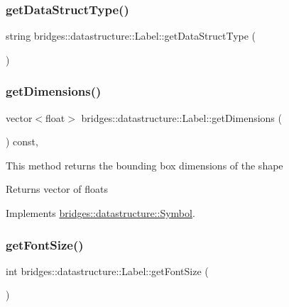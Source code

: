 \subsubsection{\texorpdfstring{get\+Data\+Struct\+Type()}{getDataStructType()}}
{\footnotesize\ttfamily string bridges\+::datastructure\+::\+Label\+::get\+Data\+Struct\+Type (\begin{DoxyParamCaption}{ }\end{DoxyParamCaption})\hspace{0.3cm}{\ttfamily [inline]}}

\mbox{\label{classbridges_1_1datastructure_1_1_label_a39f904db9e21e038aa4c7cb274f657a5}} 
\subsubsection{\texorpdfstring{get\+Dimensions()}{getDimensions()}}
{\footnotesize\ttfamily vector$<$float$>$ bridges\+::datastructure\+::\+Label\+::get\+Dimensions (\begin{DoxyParamCaption}{ }\end{DoxyParamCaption}) const\hspace{0.3cm}{\ttfamily [inline]}, {\ttfamily [virtual]}}

This method returns the bounding box dimensions of the shape

\begin{DoxyReturn}{Returns}
vector of floats 
\end{DoxyReturn}


Implements \hyperlink{classbridges_1_1datastructure_1_1_symbol_a5c1cb50770c4f4a2ff9c8642afc0d665}{bridges\+::datastructure\+::\+Symbol}.

\mbox{\label{classbridges_1_1datastructure_1_1_label_a200cc9710f28af2e63738d5166eaa51f}} 
\subsubsection{\texorpdfstring{get\+Font\+Size()}{getFontSize()}}
{\footnotesize\ttfamily int bridges\+::datastructure\+::\+Label\+::get\+Font\+Size (\begin{DoxyParamCaption}{ }\end{DoxyParamCaption})\hspace{0.3cm}{\ttfamily [inline]}}

